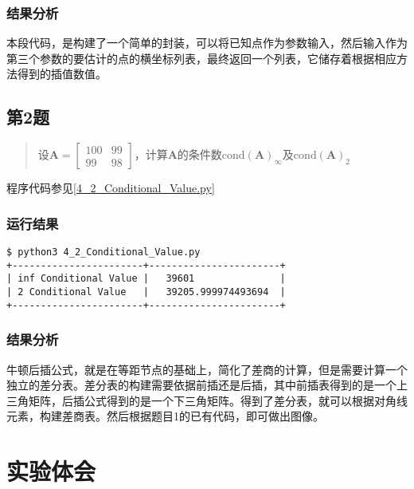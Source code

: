\subsubsection{结果分析}

本段代码，是构建了一个简单的封装，可以将已知点作为参数输入，然后输入作为第三个参数的要估计的点的横坐标列表，最终返回一个列表，它储存着根据相应方法得到的插值数值。


\subsection{第2题}
\begin{quote}
    {\kaishu
        设$\mathbf{A}=\left[ \begin{array}{rr}{100} & {99} \\ {99} & {98}\end{array}\right]$，计算$\mathbf{A}$的条件数$\mathrm{cond}(\mathbf{A})_{\infty}$及$\mathrm{cond}(\mathbf{A})_{2}$
    }
\end{quote}

程序代码参见\ref{4_2_Conditional_Value.py}

\subsubsection{运行结果}

\begin{lstlisting}[style = bash]
$ python3 4_2_Conditional_Value.py 
+-----------------------+-----------------------+
| inf Conditional Value |   39601               |
| 2 Conditional Value   |   39205.999974493694  |
+-----------------------+-----------------------+
\end{lstlisting}

\subsubsection{结果分析}
牛顿后插公式，就是在等距节点的基础上，简化了差商的计算，但是需要计算一个独立的差分表。差分表的构建需要依据前插还是后插，其中前插表得到的是一个上三角矩阵，后插公式得到的是一个下三角矩阵。得到了差分表，就可以根据对角线元素，构建差商表。然后根据题目1的已有代码，即可做出图像。

\section{实验体会}

